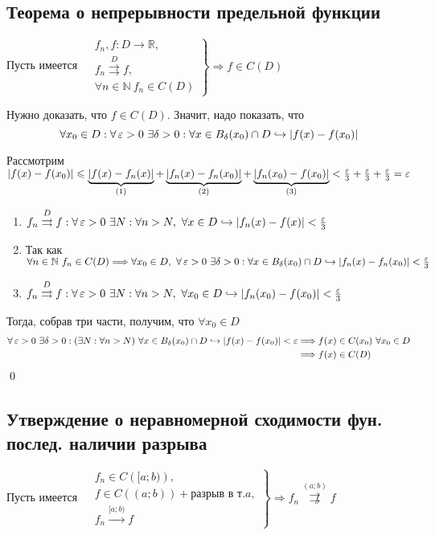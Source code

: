 \documentclass[a4paper]{article}
\begin{document}
\subsection{Теорема о непрерывности предельной функции}
\theorem Пусть имеется $\left.\begin{aligned}
    &f_n,f: D\longrightarrow\mathbb{R},\\
    &f_n\overset{D}{\rightrightarrows} f,\\
    &\forall n\in\mathbb{N}\ f_n\in C(D)
\end{aligned}\right\}\Longrightarrow f\in C(D)$

\proof Нужно доказать, что $f\in C(D)$. Значит, надо показать, что 
\begin{equation*}
    \forall x_0\in D: \forall\operatorname{\varepsilon}>0\ \exists\delta>0:\forall x\in B_{\delta}(x_0)\cap D\hookrightarrow|f(x)-f(x_0)|
\end{equation*}

Рассмотрим $|f(x)-f(x_0)|\leqslant\underbrace{|f(x)-f_n(x)|}_{(1)}+\underbrace{|f_n(x)-f_n(x_0)|}_{(2)}+\underbrace{|f_n(x_0)-f(x_0)|}_{(3)}<\frac{\operatorname{\varepsilon}}{3}+\frac{\operatorname{\varepsilon}}{3}+\frac{\operatorname{\varepsilon}}{3}=\operatorname{\varepsilon}$
\begin{enumerate}
    \item $f_n\overset{D}{\rightrightarrows} f:\forall\operatorname{\varepsilon}>0\ \exists N:\forall n>N,\ \forall x\in D\hookrightarrow|f_n(x)-f(x)|<\frac{\operatorname{\varepsilon}}{3}$
    \item Так как $\forall n\in\mathbb{N}\ f_n\in C(D)\Longrightarrow\forall x_0\in D,\ \forall\ve>0\ \exists\delta>0:\forall x\in B_{\delta}(x_0)\cap D\hookrightarrow|f_n(x)-f_n(x_0)|<\frac{\ve}{3}$
    \item $f_n\overset{D}{\rightrightarrows} f:\forall\operatorname{\varepsilon}>0\ \exists N:\forall n>N,\ \forall x_0\in D\hookrightarrow|f_n(x_0)-f(x_0)|<\frac{\operatorname{\varepsilon}}{3}$
\end{enumerate}

Тогда, собрав три части, получим, что $\forall x_0\in D$
\begin{equation*}
    \begin{aligned}
        \forall\ve>0\ \exists \delta>0:(\exists N:\forall n>N)\ \forall x\in B_{\delta}(x_0)\cap D\hookrightarrow|f(x)-f(x_0)|<\ve&\Longrightarrow f(x)\in C(x_0)\ \forall x_0\in D\\
        &\Longrightarrow f(x)\in C(D)
    \end{aligned}
\end{equation*}\qed


\subsection{Утверждение о неравномерной сходимости фун. послед. наличии разрыва}
\theorem Пусть имеется $\left.\begin{aligned}
    &f_n\in C\left([a;b)\right),\\
    &f\in C((a;b))+\text{разрыв в т.}a,\\
    &f_n\overset{[a;b)}{\longrightarrow} f
\end{aligned}\right\}\Longrightarrow f_n\overset{(a;b)}{\not\rightrightarrows} f$
\end{document}
